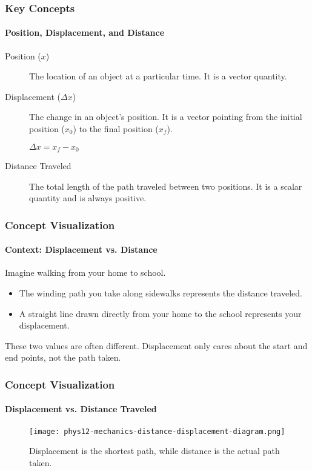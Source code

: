 \documentclass{beamer}
\begin{document}
\begin{frame}
\frametitle{Key Concepts}
\framesubtitle{Position, Displacement, and Distance}
\begin{description}
    \item[Position ($x$)] The location of an object at a particular time. It is a vector quantity.
    \pause
    \item[Displacement ($\Delta x$)] The change in an object's position. It is a vector pointing from the initial position ($x_0$) to the final position ($x_f$).
    \begin{center}
        $\Delta x = x_f - x_0$
    \end{center}
    \pause
    \item[Distance Traveled] The total length of the path traveled between two positions. It is a scalar quantity and is always positive.
\end{description}
\end{frame}

\begin{frame}
\frametitle{Concept Visualization}
\framesubtitle{Context: Displacement vs. Distance}
Imagine walking from your home to school.
\begin{itemize}
    \item The winding path you take along sidewalks represents the \alert{distance traveled}.
    \item A straight line drawn directly from your home to the school represents your \alert{displacement}.
\end{itemize}
\vspace{1em}
These two values are often different. Displacement only cares about the start and end points, not the path taken.
\end{frame}

\begin{frame}
\frametitle{Concept Visualization}
\framesubtitle{Displacement vs. Distance Traveled}
\begin{figure}
    \centering
    \texttt{[image: phys12-mechanics-distance-displacement-diagram.png]}
    \caption{Displacement is the shortest path, while distance is the actual path taken.}
\end{figure}
\end{frame}
\end{document}
